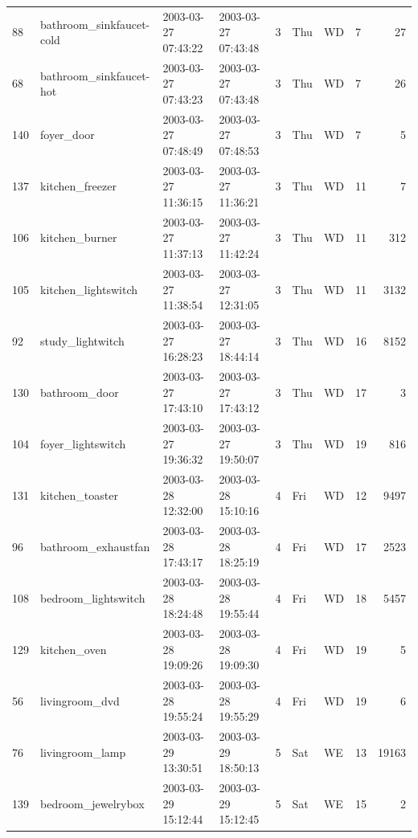 \documentclass[11pt,]{article}
\begin{document}
\begin{table}[!h]
{\begin{tabular}[t]{>{}l>{}lllllllr}
\rowcolor[HTML]{EACBF2}  88 & bathroom\_sinkfaucet-cold & 2003-03-27 07:43:22 & 2003-03-27 07:43:48 & 3 & Thu & WD & 7 & 27\\
\rowcolor[HTML]{C6CDF2}  68 & bathroom\_sinkfaucet-hot & 2003-03-27 07:43:23 & 2003-03-27 07:43:48 & 3 & Thu & WD & 7 & 26\\
\addlinespace
\rowcolor[HTML]{EACBF2}  140 & foyer\_door & 2003-03-27 07:48:49 & 2003-03-27 07:48:53 & 3 & Thu & WD & 7 & 5\\
\rowcolor[HTML]{C6CDF2}  137 & kitchen\_freezer & 2003-03-27 11:36:15 & 2003-03-27 11:36:21 & 3 & Thu & WD & 11 & 7\\
\rowcolor[HTML]{EACBF2}  106 & kitchen\_burner & 2003-03-27 11:37:13 & 2003-03-27 11:42:24 & 3 & Thu & WD & 11 & 312\\
\rowcolor[HTML]{C6CDF2}  105 & kitchen\_lightswitch & 2003-03-27 11:38:54 & 2003-03-27 12:31:05 & 3 & Thu & WD & 11 & 3132\\
\rowcolor[HTML]{C6CDF2}  92 & study\_lightwitch & 2003-03-27 16:28:23 & 2003-03-27 18:44:14 & 3 & Thu & WD & 16 & 8152\\
\addlinespace
\rowcolor[HTML]{C6CDF2}  130 & bathroom\_door & 2003-03-27 17:43:10 & 2003-03-27 17:43:12 & 3 & Thu & WD & 17 & 3\\
\rowcolor[HTML]{EACBF2}  104 & foyer\_lightswitch & 2003-03-27 19:36:32 & 2003-03-27 19:50:07 & 3 & Thu & WD & 19 & 816\\
\rowcolor[HTML]{C6CDF2}  131 & kitchen\_toaster & 2003-03-28 12:32:00 & 2003-03-28 15:10:16 & 4 & Fri & WD & 12 & 9497\\
\rowcolor[HTML]{EACBF2}  96 & bathroom\_exhaustfan & 2003-03-28 17:43:17 & 2003-03-28 18:25:19 & 4 & Fri & WD & 17 & 2523\\
\rowcolor[HTML]{EACBF2}  108 & bedroom\_lightswitch & 2003-03-28 18:24:48 & 2003-03-28 19:55:44 & 4 & Fri & WD & 18 & 5457\\
\addlinespace
\rowcolor[HTML]{EACBF2}  129 & kitchen\_oven & 2003-03-28 19:09:26 & 2003-03-28 19:09:30 & 4 & Fri & WD & 19 & 5\\
\rowcolor[HTML]{CEF5E7}  56 & livingroom\_dvd & 2003-03-28 19:55:24 & 2003-03-28 19:55:29 & 4 & Fri & WD & 19 & 6\\
\rowcolor[HTML]{EACBF2}  76 & livingroom\_lamp & 2003-03-29 13:30:51 & 2003-03-29 18:50:13 & 5 & Sat & WE & 13 & 19163\\
\rowcolor[HTML]{CEF5E7}  139 & bedroom\_jewelrybox & 2003-03-29 15:12:44 & 2003-03-29 15:12:45 & 5 & Sat & WE & 15 & 2\\

\end{tabular}}
\end{table}
\end{document}
